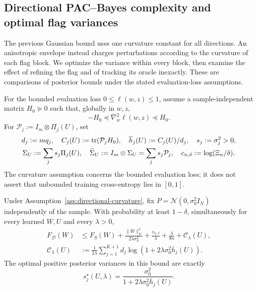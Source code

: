 \subsection{Directional PAC--Bayes complexity and optimal flag variances}
The previous Gaussian bound uses one curvature constant for all directions.
An anisotropic envelope instead charges perturbations according to the
curvature of each flag block. We optimize the variance within every block,
then examine the effect of refining the flag and of tracking its oracle
inexactly. These are comparisons of posterior bounds under the stated
evaluation-loss assumptions.

\begin{assumption}\label{ass:directional-curvature}
For the bounded evaluation loss $0\le\ell(w,z)\le1$, assume a sample-independent
matrix $H_0\succeq0$ such that, globally in $w,z$,
\begin{equation}
 -H_0\preceq\nabla_w^2\ell(w,z)\preceq H_0.
\end{equation}
For $\mathcal P_j:=I_m\otimes\Pi_j(U)$, set
\begin{gather}
 d_j:=mq_j,\quad C_j(U):=\operatorname{tr}(\mathcal P_jH_0),\quad
 \overline h_j(U):=C_j(U)/d_j,\quad s_j:=\sigma_j^2>0,\\
 \Sigma_U:=\sum_j s_j\Pi_j(U),\quad
 \widetilde\Sigma_U:=I_m\otimes\Sigma_U=\sum_j s_j\mathcal P_j,\quad
 c_{n,\delta}:=\log(\Xi_n/\delta).
\end{gather}
The curvature assumption concerns the bounded evaluation loss; it does not
assert that unbounded training cross-entropy lies in $[0,1]$.
\end{assumption}
\begin{theorem}\label{thm:directional-pac}
Under Assumption~\ref{ass:directional-curvature}, fix
$P=\mathcal N(0,\sigma_0^2I_N)$ independently of the sample. With probability
at least $1-\delta$, simultaneously for every learned $W,U$ and every $\lambda>0$,
\begin{align}
 F_\mathcal D(W)
 &\le F_S(W)+\frac{\|W\|_F^2}{2\lambda\sigma_0^2}
 +\frac{c_{n,\delta}}\lambda+\frac\lambda{8n}
 +\mathcal C_\lambda(U),\\
 \mathcal C_\lambda(U)
 &:=\frac1{2\lambda}\sum_{j=1}^{K+1}d_j
                 \log(1+2\lambda\sigma_0^2\overline h_j(U)).
 \label{eq:directional-complexity}
\end{align}
The optimal positive posterior variances in this bound are exactly
\begin{equation}
 s_j^\star(U,\lambda)
 =\frac{\sigma_0^2}{1+2\lambda\sigma_0^2\overline h_j(U)}.
\end{equation}
\end{theorem}
